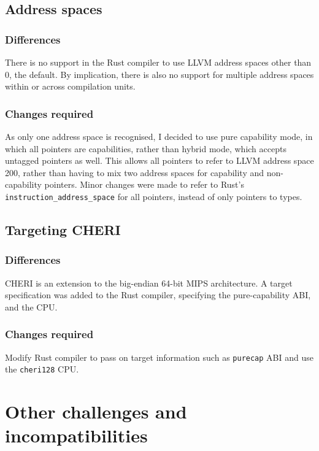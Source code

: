 \documentclass[dissertation.tex]{subfiles}
\begin{document}
\subsection{Address spaces}
\label{sec:impl-addrspace}

\subsubsection{Differences}
There is no support in the Rust compiler to use LLVM address spaces
other than 0, the default.
By implication, there is also no support for multiple address spaces
within or across compilation units.

\subsubsection{Changes required}
As only one address space is recognised, I decided to use pure
capability mode, in which all pointers are capabilities, rather than
hybrid mode, which accepts untagged pointers as well.
This allows all pointers to refer to LLVM address space 200, rather than
having to mix two address spaces for capability and non-capability
pointers.
Minor changes were made to refer to Rust's
\texttt{instruction\_address\_space} for all pointers, instead of only
pointers to types.


\subsection{Targeting CHERI}

\subsubsection{Differences}
CHERI is an extension to the big-endian 64-bit MIPS architecture.
A target specification was added to the Rust compiler, specifying the
pure-capability ABI, and the CPU.

\subsubsection{Changes required}
Modify Rust compiler to pass on target information such as
\texttt{purecap} ABI and use the \texttt{cheri128} CPU.


\section{Other challenges and incompatibilities}
\end{document}
